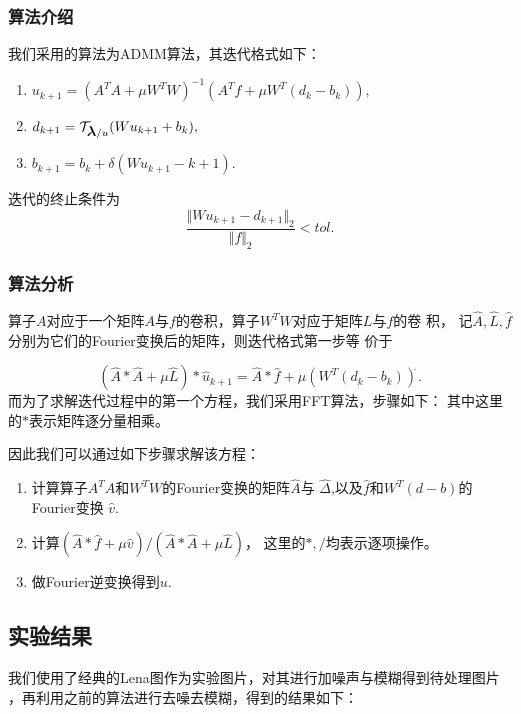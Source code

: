 \documentclass[a4paper,  11pt]{ctexart}
\newcommand{\bm}[1]{\mbox{\boldmath{$#1$}}}
\begin{document}
\subsubsection{算法介绍}
我们采用的算法为ADMM算法，其迭代格式如下：
\begin{enumerate}
    \item $u_{k+1}=(A^TA+\mu W^TW)^{-1}(A^Tf+\mu W^T(d_k-b_k)),$
    \item $d_{k+1}=\mathcal{T}_{\bm\lambda/u}(Wu_{k+1}+b_k),$
    \item $b_{k+1}=b_k+\delta(Wu_{k+1}-{k+1}).$
\end{enumerate}
迭代的终止条件为
\[
\frac{\Vert Wu_{k+1}-d_{k+1}\Vert_2 }{\Vert f\Vert_2}<tol.
\]
\subsubsection{算法分析}

算子$A$对应于一个矩阵$A$与$f$的卷积，算子$W^TW$对应于矩阵$L$与$f$的卷
积，
记$\hat{A},\hat{L},\hat{f}$分别为它们的Fourier变换后的矩阵，则迭代格式第一步等
价于

\[
    (\hat{A}*\hat{A}+\mu\hat{L})*\hat{u}_{k+1}=\hat{A}*\hat{f}+\mu
    (W^T(d_k-b_k))^{\hat{} }.
\]
而为了求解迭代过程中的第一个方程，我们采用FFT算法，步骤如下：
其中这里的$*$表示矩阵逐分量相乘。\par
因此我们可以通过如下步骤求解该方程：
\begin{enumerate}
    \item 计算算子$A^TA$和$W^TW$的Fourier变换的矩阵$\hat{A}$与
        $\hat{\Delta}$,以及$\hat{f}$和$W^T(d-b)$的Fourier变换
        $\hat{v}$.
    \item 计算$
        (\hat{A}*\hat{f}+\mu\hat{v})/(\hat{A}*\hat{A}+\mu\hat{L})$，
        这里的$*,/$均表示逐项操作。
    \item 做Fourier逆变换得到$u$.
\end{enumerate}


\subsection{实验结果}

我们使用了经典的Lena图作为实验图片，对其进行加噪声与模糊得到待处理图片
，再利用之前的算法进行去噪去模糊，得到的结果如下：
\end{document}
